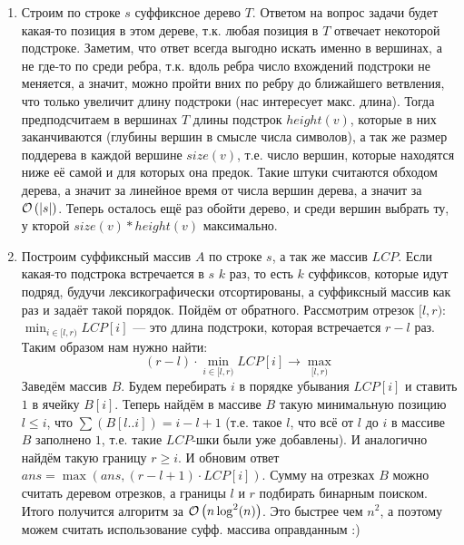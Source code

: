 \begin{solution}
\begin{enumerate}
	\item Строим по строке $s$ суффиксное дерево $T$. Ответом на вопрос задачи будет какая-то позиция в этом дереве,
	т.к. любая позиция в $T$ отвечает некоторой подстроке. Заметим, что ответ всегда выгодно искать именно в вершинах, а не где-то по среди ребра, т.к. вдоль ребра число вхождений подстроки не меняется, а значит, можно пройти вних по ребру до ближайшего ветвления, что только увеличит длину подстроки (нас интересует макс. длина). Тогда предподсчитаем в вершинах $T$ длины подстрок $height(v)$, которые в них заканчиваются (глубины вершин в смысле числа символов), а так же размер поддерева в каждой вершине $size(v)$, т.е. число вершин, которые находятся ниже её самой и для которых она предок. Такие штуки считаются обходом дерева, а значит за линейное время от числа вершин дерева, а значит за $\mathcal{O}\left(|s|\right)$. Теперь осталось ещё раз обойти дерево, и среди вершин выбрать ту, у кторой $size(v) * height(v)$ максимально. \xqed
	\item Построим суффиксный массив $A$ по строке $s$, а так же массив $LCP$. Если какая-то подстрока встречается в $s$ $k$ раз, то есть $k$ суффиксов, которые идут подряд, будучи лексикографически отсортированы, а суффиксный массив как раз и задаёт такой порядок. Пойдём от обратного. Рассмотрим отрезок $[l, r)$: $\min_{i \in [l, r)}{LCP[i]}$ --- это длина подстроки, которая встречается $r - l$ раз. Таким образом нам нужно найти:
	\[
		(r - l) \cdot \min_{i \in [l, r)}{LCP[i]} \longrightarrow \max_{[l, r)}
	\]
	Заведём массив $B$. Будем перебирать $i$ в порядке убывания $LCP[i]$ и ставить $1$ в ячейку $B[i]$. Теперь найдём в массиве $B$ такую минимальную позицию $l \leq i$, что $\sum(B[l..i]) = i - l + 1$ (т.е. такое $l$, что всё от $l$ до $i$ в массиве $B$ заполнено $1$, т.е. такие $LCP$-шки были уже добавлены). И аналогично найдём такую границу $r \geq i$. И обновим ответ $ans = \max{(ans, (r - l + 1) \cdot LCP[i])}$. Сумму на отрезках $B$ можно считать деревом отрезков, а границы $l$ и $r$ подбирать бинарным поиском. Итого получится алгоритм за $\mathcal{O}\left(n\log^2(n)\right)$.
	Это быстрее чем $n^2$, а поэтому можем считать использование суфф. массива оправданным :) \xqed
\end{enumerate}
\end{solution}

